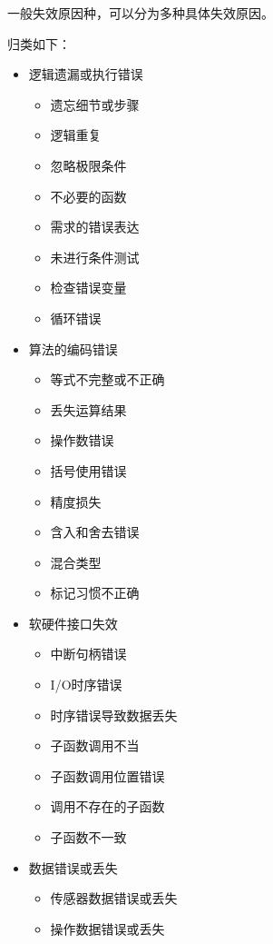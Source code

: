 一般失效原因种，可以分为多种具体失效原因。

归类如下：

\begin{multicols}{2}
\begin{itemize}
    \item 逻辑遗漏或执行错误
    \begin{itemize}
        \item 遗忘细节或步骤
        \item 逻辑重复
        \item 忽略极限条件
        \item 不必要的函数
        \item 需求的错误表达
        \item 未进行条件测试
        \item 检查错误变量
        \item 循环错误
    \end{itemize}
    \item 算法的编码错误
    \begin{itemize}
        \item 等式不完整或不正确
        \item 丢失运算结果
        \item 操作数错误
        \item 括号使用错误
        \item 精度损失
        \item 含入和舍去错误
        \item 混合类型
        \item 标记习惯不正确
    \end{itemize}
    \item 软硬件接口失效
    \begin{itemize}
        \item 中断句柄错误
        \item I/O时序错误
        \item 时序错误导致数据丢失
        \item 子函数调用不当
        \item 子函数调用位置错误
        \item 调用不存在的子函数
        \item 子函数不一致
    \end{itemize}
    \item 数据错误或丢失
    \begin{itemize}
        \item 传感器数据错误或丢失
        \item 操作数据错误或丢失

\end{itemize}
\end{itemize}
\end{multicols}
